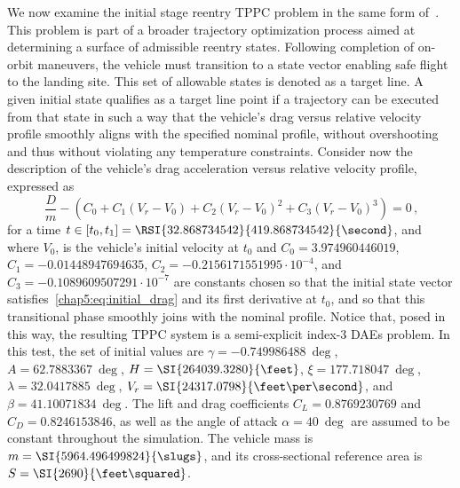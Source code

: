 We now examine the initial stage reentry \ac{TPPC} problem in the same form of~\cite{brenan1986numerical}. This problem is part of a broader trajectory optimization process aimed at determining a surface of admissible reentry states. Following completion of on-orbit maneuvers, the vehicle must transition to a state vector enabling safe flight to the landing site. This set of allowable states is denoted as a target line. A given initial state qualifies as a target line point if a trajectory can be executed from that state in such a way that the vehicle's drag versus relative velocity profile smoothly aligns with the specified nominal profile, without overshooting and thus without violating any temperature constraints. Consider now the description of the vehicle's drag acceleration versus relative velocity profile, expressed as
%
\begin{equation}
  \dfrac{D}{m} - (C_0 + C_1 (V_r - V_0) + C_2 (V_r - V_0)^2 + C_3 (V_r - V_0)^3) = 0 \, \text{,}
  \label{chap5:eq:initial_drag}
\end{equation}
%
for a time $t \in [t_0, t_1] = \RSI{32.868734542}{419.868734542}{\second}$, and where $V_0$, is the vehicle's initial velocity at $t_0$ and $C_0 = 3.974960446019$, $C_1 = -0.01448947694635$, $C_2 = -0.2156171551995 \cdot 10^{-4}$, and $C_3 = -0.1089609507291 \cdot 10^{-7}$ are constants chosen so that the initial state vector satisfies~\eqref{chap5:eq:initial_drag} and its first derivative at $t_0$, and so that this transitional phase smoothly joins with the nominal profile. Notice that, posed in this way, the resulting \ac{TPPC} system is a semi-explicit index-3 \acp{DAE} problem. In this test, the set of initial values are $\gamma = \SI{-0.749986488}{\deg}$, $A = \SI{62.7883367}{\deg}$, $H = \SI{264039.3280}{\feet}$, $\xi = \SI{177.718047}{\deg}$, $\lambda = \SI{32.0417885}{\deg}$, $V_r = \SI{24317.0798}{\feet\per\second}$, and $\beta = \SI{41.10071834}{\deg}$. The lift and drag coefficients $C_L = 0.8769230769$ and $C_D = 0.8246153846$, as well as the angle of attack $\alpha = \SI{40}{\deg}$ are assumed to be constant throughout the simulation. The vehicle mass is $m = \SI{5964.496499824}{\slugs}$, and its cross-sectional reference area is $S = \SI{2690}{\feet\squared}$.

